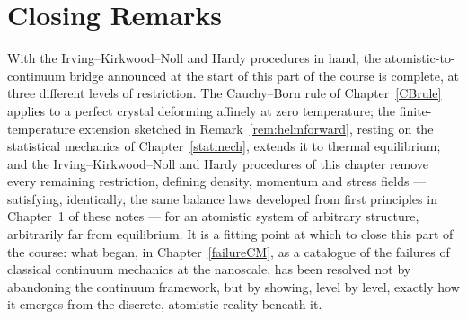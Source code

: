 \section{Closing Remarks}

With the Irving--Kirkwood--Noll and Hardy procedures in hand, the atomistic-to-continuum bridge announced at the start of this part of the course is complete, at three different levels of restriction. The Cauchy--Born rule of Chapter~\ref{CBrule} applies to a perfect crystal deforming affinely at zero temperature; the finite-temperature extension sketched in Remark~\ref{rem:helmforward}, resting on the statistical mechanics of Chapter~\ref{statmech}, extends it to thermal equilibrium; and the Irving--Kirkwood--Noll and Hardy procedures of this chapter remove every remaining restriction, defining density, momentum and stress fields --- satisfying, identically, the same balance laws developed from first principles in Chapter~1 of these notes --- for an atomistic system of arbitrary structure, arbitrarily far from equilibrium. It is a fitting point at which to close this part of the course: what began, in Chapter~\ref{failureCM}, as a catalogue of the failures of classical continuum mechanics at the nanoscale, has been resolved not by abandoning the continuum framework, but by showing, level by level, exactly how it emerges from the discrete, atomistic reality beneath it.
